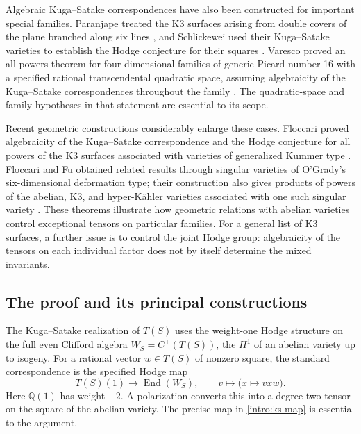 \documentclass[11pt]{article}
\numberwithin{equation}{section}
\theoremstyle{definition}
\theoremstyle{remark}
\newcommand{\Q}{\mathbb Q}
\DeclareMathOperator{\End}{End}
\begin{document}
Algebraic Kuga--Satake correspondences have also been constructed for
important special families.  Paranjape treated the K3 surfaces arising
from double covers of the plane branched along six lines \cite{Paranjape},
and Schlickewei used their Kuga--Satake varieties to establish the Hodge
conjecture for their squares \cite[Theorem~2]{Schlickewei}.  Varesco proved an
all-powers theorem for four-dimensional families of generic Picard number
16 with a specified rational transcendental quadratic space, assuming
algebraicity of the Kuga--Satake correspondences throughout the family
\cite[Theorem~0.2]{VarescoPowers}.  The quadratic-space and family
hypotheses in that statement are essential to its scope.

Recent geometric constructions considerably enlarge these cases.
Floccari proved algebraicity of the Kuga--Satake correspondence and the
Hodge conjecture for all powers of the K3 surfaces associated with varieties
of generalized Kummer type \cite[Theorem~1.2]{FloccariKummer}.
Floccari and Fu obtained related results through singular varieties of
O'Grady's six-dimensional deformation type; their construction also gives
products of powers of the abelian, K3, and hyper-K\"ahler varieties
associated with one such singular variety
\cite[Theorem~5.7 and Corollary~5.8]{FloccariFu}.  These theorems illustrate
how geometric relations with abelian varieties control exceptional tensors
on particular families.  For a general list of K3 surfaces, a further
issue is to control the joint Hodge group: algebraicity of the tensors on
each individual factor does not by itself determine the mixed invariants.



\subsection{The proof and its principal constructions}

The Kuga--Satake realization of \(T(S)\) uses the
weight-one Hodge structure on the full even Clifford algebra
\(W_S=C^+(T(S))\), the \(H^1\) of an abelian variety up to isogeny.
For a rational vector \(w\in T(S)\) of nonzero square, the standard
correspondence is the specified Hodge map
\begin{equation}\label{intro:ks-map}
 T(S)(1)\longrightarrow\End(W_S),\qquad
 v\longmapsto\bigl(x\longmapsto vxw\bigr).
\end{equation}
Here \(\Q(1)\) has weight \(-2\).  A polarization converts this into
a degree-two tensor on the square of the abelian variety.
The precise map in \eqref{intro:ks-map} is essential to the argument.
\end{document}
